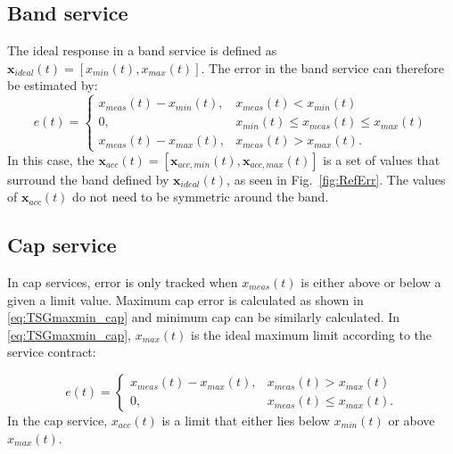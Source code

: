 \subsection*{Band service}
The ideal response in a band service is defined as $ \mathbf{x}_{ideal}(t)= [x_{min}(t),x_{max}(t)]$. The error in the band service can therefore be estimated by:
\begin{equation}\label{eq:TSGband_error}
e(t)=
\begin{cases}
x_{meas}(t) - x_{min}(t) , & x_{meas}(t) < x_{min}(t)  \\
0, & x_{min}(t) \leq x_{meas}(t) \leq x_{max}(t) \\
x_{meas}(t) - x_{max}(t), & x_{meas}(t)  > x_{max}(t).  
\end{cases}
\end{equation}
In this case, the $\mathbf{x}_{acc}(t) = [\mathbf{x}_{acc,min}(t),\mathbf{x}_{acc,max}(t)]$ is a set of values that surround the band defined by $ \mathbf{x}_{ideal}(t)$, as seen in Fig.~\ref{fig:RefErr}. The values of $\mathbf{x}_{acc}(t)$ do not need to be symmetric around the band. 

\subsection*{Cap service}
In cap services, error is only tracked when $x_{meas}(t)$ is either above or below a given a limit value.
Maximum cap error is calculated as shown in \eqref{eq:TSGmaxmin_cap} and minimum cap can be similarly calculated. In \eqref{eq:TSGmaxmin_cap}, $x_{max}(t)$ is the ideal maximum limit according to the service contract:

\begin{equation}\label{eq:TSGmaxmin_cap}
e(t)=
\begin{cases}
x_{meas}(t)-x_{max}(t), & x_{meas}(t) > x_{max}(t) \\
0, & x_{meas}(t) \leq x_{max}(t).
\end{cases}
\end{equation}
In the cap service, $x_{acc}(t)$ is a limit that either lies below $x_{min}(t)$ or above $x_{max}(t)$.

